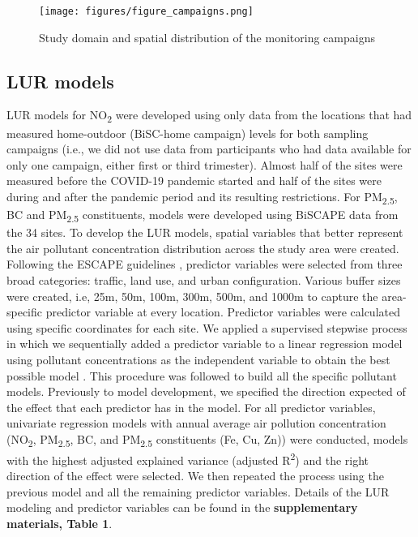 \documentclass{article}
\begin{document}
\captionsetup[figure]{skip=0pt}
\begin{figure}[!htb]
\texttt{[image: figures/figure\_campaigns.png]}
\caption{Study domain and spatial distribution of the monitoring campaigns}
\label{fig1}
\end{figure}

\subsection{LUR models}

LUR models for NO\textsubscript{2} were developed using only data from the locations that had measured home-outdoor (BiSC-home campaign) levels for both sampling campaigns (i.e., we did not use data from participants who had data available for only one campaign, either first or third trimester). Almost half of the sites were measured before the COVID-19 pandemic started and half of the sites were during and after the pandemic period and its resulting restrictions. For PM\textsubscript{2.5}, BC  and PM\textsubscript{2.5} constituents, models were developed using BiSCAPE data from the 34 sites. To develop the LUR models, spatial variables that better represent the air pollutant concentration distribution across the study area were created. Following the ESCAPE guidelines \cite{ESCAPE2010, eeftens2012, beelen2013}, predictor variables were selected from three broad categories: traffic, land use, and urban configuration. Various buffer sizes were created, i.e, 25m, 50m, 100m, 300m, 500m, and 1000m to capture the area-specific predictor variable at every location. Predictor variables were calculated using specific coordinates for each site. We applied a supervised stepwise process in which we sequentially added a predictor variable to a linear regression model using pollutant concentrations as the independent variable to obtain the best possible model \cite{eeftens2012, beelen2013}. This procedure was followed to build all the specific pollutant models. Previously to model development, we specified the direction expected of the effect that each predictor has in the model. For all predictor variables, univariate regression models with annual average air pollution concentration (NO\textsubscript{2}, PM\textsubscript{2.5}, BC, and PM\textsubscript{2.5} constituents (Fe, Cu, Zn)) were conducted, models with the highest adjusted explained variance (adjusted R\textsuperscript{2}) and the right direction of the effect were selected. We then repeated the process using the previous model and all the remaining predictor variables. Details of the LUR modeling and predictor variables can be found in the \textbf{supplementary materials, Table 1}.
\end{document}
